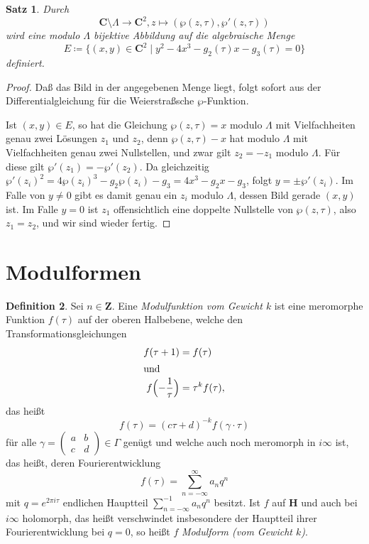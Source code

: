 \documentclass[a4paper,twoside,openright]{report}
\newtheorem{thm}{Satz}[chapter]
\theoremstyle{definition}
\newtheorem{dfn}[thm]{Definition}
\theoremstyle{remark}
\begin{document}
\begin{thm}
  Durch
  \[
    \mathbf C \setminus \Lambda \to \mathbf C^2, z \mapsto (\wp(z, \tau), \wp'(z, \tau))
  \]
  wird eine modulo $\Lambda$ bijektive Abbildung auf die algebraische Menge
  \[
    E \coloneqq \{(x, y) \in \mathbf C^2 \mid y^2 - 4 x^3 - g_2(\tau) x - g_3(\tau) = 0\}
  \]
  definiert.
\end{thm}

\begin{proof}
  Daß das Bild in der angegebenen Menge liegt, folgt sofort aus der Differentialgleichung
  für die Weierstraßsche $\wp$-Funktion.
  
  Ist $(x, y) \in E$, so hat die Gleichung $\wp(z, \tau) = x$ modulo $\Lambda$
  mit Vielfachheiten genau zwei Lösungen $z_1$ und $z_2$, denn $\wp(z, \tau) - x$ hat modulo $\Lambda$ mit Vielfachheiten
  genau zwei Nullstellen, und zwar gilt $z_2 = -z_1$ modulo $\Lambda$. Für diese gilt $\wp'(z_1) = -\wp'(z_2)$. Da
  gleichzeitig $\wp'(z_i)^2 = 4 \wp(z_i)^3 - g_2 \wp(z_i) - g_3 = 4 x^3 - g_2 x - g_3$,
  folgt $y = \pm \wp'(z_i)$. Im Falle von $y \neq 0$ gibt es damit genau ein
  $z_i$ modulo $\Lambda$, dessen Bild gerade $(x, y)$ ist. Im Falle $y = 0$ ist
  $z_1$ offensichtlich eine doppelte Nullstelle von $\wp(z, \tau)$, also $z_1 = z_2$,
  und wir sind wieder fertig.
\end{proof}

\section{Modulformen}

\begin{dfn}
  Sei $n \in \mathbf Z$.
  Eine \emph{Modulfunktion vom Gewicht $k$} ist eine meromorphe Funktion $f(\tau)$ auf der
  oberen Halbebene, welche den Transformationsgleichungen
  \begin{align*}
    f(\tau + 1) & = f(\tau) \\
    \intertext{und}
    f\Bigl(- \frac 1 \tau\Bigr) & = \tau^{k} f(\tau),
  \end{align*}
  das heißt
  \[
    f(\tau) = (c \tau + d)^{-k} f(\gamma \cdot \tau)
  \]
  für alle $\gamma = (\begin{smallmatrix} a & b \\ c & d\end{smallmatrix}) \in \Gamma$
  genügt und welche auch noch meromorph in $i \infty$ ist, das heißt, deren Fourierentwicklung
  \[
    f(\tau) = \sum_{n = -\infty}^\infty a_n q^n
  \]
  mit $q = e^{2 \pi i \tau}$ endlichen Hauptteil $\sum_{n = -\infty}^{-1} a_n q^n$
  besitzt. Ist $f$ auf $\mathbf H$ und auch bei $i \infty$ holomorph, das heißt verschwindet
  insbesondere der Hauptteil ihrer Fourierentwicklung bei $q = 0$, so heißt $f$ \emph{Modulform (vom Gewicht $k$)}.
\end{dfn}
\end{document}

